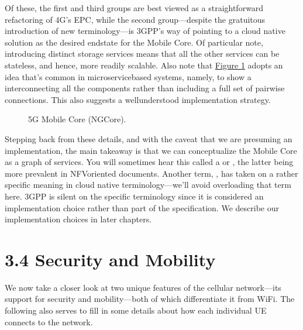 \documentclass[a4paper,11pt,english]{sphinxmanual}
\let\sphinxpxdimen\pdfpxdimen\else\newdimen\sphinxpxdimen
\begin{document}
\sphinxAtStartPar
Of these, the first and third groups are best viewed as a
straightforward refactoring of 4G’s EPC, while the second group—despite
the gratuitous introduction of new terminology—is 3GPP’s way of pointing
to a cloud native solution as the desired end\sphinxhyphen{}state for the Mobile Core.
Of particular note, introducing distinct storage services means that all
the other services can be stateless, and hence, more readily scalable.
Also note that \hyperref[\detokenize{arch:fig-5g-core}]{Figure \ref{\detokenize{arch:fig-5g-core}}} adopts an idea that’s
common in microservice\sphinxhyphen{}based systems, namely, to show a 
interconnecting all the components rather than including a full set of
pairwise connections. This also suggests a well\sphinxhyphen{}understood
implementation strategy.

\begin{figure}[ht]
\centering
\capstart

\noindent\sphinxincludegraphics[width=700\sphinxpxdimen]{{Slide33}.png}
\caption{5G Mobile Core (NG\sphinxhyphen{}Core).}\label{\detokenize{arch:id11}}\label{\detokenize{arch:fig-5g-core}}\end{figure}

\sphinxAtStartPar
Stepping back from these details, and with the caveat that we are
presuming an implementation, the main takeaway is that we can
conceptualize the Mobile Core as a graph of services. You will
sometimes hear this called a  or , the latter being more prevalent
in NFV\sphinxhyphen{}oriented documents. Another term, , has taken on
a rather specific meaning in cloud native terminology—we’ll avoid
overloading that term here. 3GPP is silent on the specific terminology
since it is considered an implementation choice rather than part of the
specification. We describe our implementation choices in later chapters.


\section{3.4 Security and Mobility}
\label{\detokenize{arch:security-and-mobility}}
\sphinxAtStartPar
We now take a closer look at two unique features of the cellular
network—its support for security and mobility—both of which
differentiate it from WiFi. The following also serves to fill in some
details about how each individual UE connects to the network.
\end{document}

